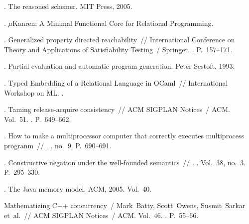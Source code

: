 \begin{thebibliography}{99}
. The reasoned
  schemer. \BibDash
\newblock MIT Press, 2005.

. $\mu$Kanren: A Minimal Functional
  Core for Relational Programming.

. Generalized property
  directed reachability~// International Conference on Theory and Applications
  of Satisfiability Testing~/ Springer. \BibDash
{}. \BibDash
\newblock P.~157--171.

. Partial evaluation and
  automatic program generation. \BibDash
\newblock Peter Sestoft, 1993.

. Typed Embedding of a Relational
  Language in OCaml~// International Workshop on ML. \BibDash
{}.

. Taming release-acquire
  consistency~// ACM SIGPLAN Notices~/ ACM. \BibDash
\newblock Vol.~51. \BibDash
{}. \BibDash
\newblock P.~649--662.

. How to make a multiprocessor computer that correctly
  executes multiprocess progranm~// .
  \BibDash
{}. \BibDash
\newblock no.~9. \BibDash
\newblock P.~690--691.

. Constructive negation
  under the well-founded semantics~// . \BibDash
{}. \BibDash
\newblock Vol.~38, no.~3. \BibDash
\newblock P.~295--330.

. The Java memory model.
  \BibDash
\newblock ACM, 2005. \BibDash
\newblock Vol.~40.

Mathematizing C++ concurrency~/ Mark~Batty, Scott~Owens, Susmit~Sarkar
  et~al.~// ACM SIGPLAN Notices~/ ACM. \BibDash
\newblock Vol.~46. \BibDash
{}. \BibDash
\newblock P.~55--66.


\end{thebibliography}
